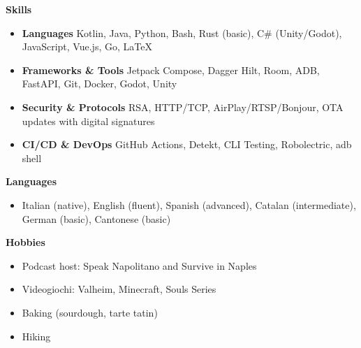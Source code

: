 \documentclass[letterpaper,12pt]{article}[leftmargin=*]
\def \entryspacing {-0pt}
\renewcommand{\section}[2]{\vspace{5pt}
  \colorbox{secondary}{\color{white}\raggedbottom\normalsize\textbf{{#1}{\hspace{7pt}#2}}}
}
\newcommand{\resumeEntryStart}{\begin{itemize}[leftmargin=2.5mm]}
\newcommand{\resumeEntryEnd}{\end{itemize}\vspace{\entryspacing}}
\newcommand{\resumeEntryS}[2]{
  \item[]\small{
    \textbf{\color{primary}#1 }{ #2 \vspace{-6pt}}
  }
}
\begin{document}
\section{}{Skills}
 \resumeEntryStart
   \resumeEntryS{Languages}{Kotlin, Java, Python, Bash, Rust (basic), C\# (Unity/Godot), JavaScript, Vue.js, Go, LaTeX}
   \resumeEntryS{Frameworks \& Tools}{Jetpack Compose, Dagger Hilt, Room, ADB, FastAPI, Git, Docker, Godot, Unity}
   \resumeEntryS{Security \& Protocols}{RSA, HTTP/TCP, AirPlay/RTSP/Bonjour, OTA updates with digital signatures}
   \resumeEntryS{CI/CD \& DevOps}{GitHub Actions, Detekt, CLI Testing, Robolectric, adb shell}
 \resumeEntryEnd

\section{}{Languages}
  \resumeEntryStart
    \resumeEntryS{}{Italian (native), English (fluent), Spanish (advanced), Catalan (intermediate), German (basic), Cantonese (basic)}
  \resumeEntryEnd

\section{}{Hobbies}
  \resumeEntryStart
    \resumeEntryS{}{Podcast host: Speak Napolitano and Survive in Naples}
    \resumeEntryS{}{Videogiochi: Valheim, Minecraft, Souls Series}
    \resumeEntryS{}{Baking (sourdough, tarte tatin)}
    \resumeEntryS{}{Hiking}
  \resumeEntryEnd
\end{document}
